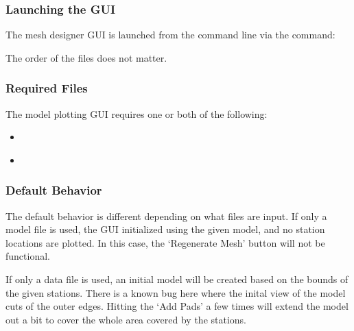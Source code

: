 \documentclass[letterpaper,10pt,english]{sphinxmanual}
\begin{document}
\subsubsection{Launching the GUI}
\label{\detokenize{content/mesh_designer/getting_started:launching-the-gui}}
The mesh designer GUI is launched from the command line via the command:

\begin{sphinxVerbatim}[commandchars=\\\{\}]
  
\end{sphinxVerbatim}

The order of the files does not matter.


\subsubsection{Required Files}
\label{\detokenize{content/mesh_designer/getting_started:required-files}}
The model plotting GUI requires one or both of the following:
\begin{itemize}
\item {} 
{\hyperref[\detokenize{content/api_core/input_files:model-file}]{}}

\item {} 
{\hyperref[\detokenize{content/api_core/input_files:data-file}]{}}

\end{itemize}


\subsubsection{Default Behavior}
\label{\detokenize{content/mesh_designer/getting_started:default-behavior}}
The default behavior is different depending on what files are input.
If only a model file is used, the GUI initialized using the given model, and no station locations are plotted. In this case, the ‘Regenerate Mesh’ button will not be functional.

If only a data file is used, an initial model will be created based on the bounds of the given stations. There is a known bug here where the inital view of the model cuts of the outer edges. Hitting the ‘Add Pads’ a few times will extend the model out a bit to cover the whole area covered by the stations.
\end{document}
